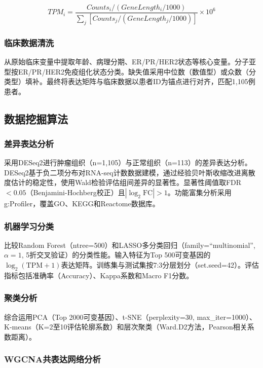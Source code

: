 \documentclass[12pt,a4paper]{article}
\begin{document}
\begin{equation}
TPM_i = \frac{Counts_i / (GeneLength_i / 1000)}{\sum_j [Counts_j / (GeneLength_j / 1000)]} \times 10^6
\end{equation}

\subsubsection{临床数据清洗}

从原始临床变量中提取年龄、病理分期、ER/PR/HER2状态等核心变量。分子亚型按ER/PR/HER2免疫组化状态分类。缺失值采用中位数（数值型）或众数（分类型）填补。最终将表达矩阵与临床数据以患者ID为锚点进行对齐，匹配1,105例患者。

\subsection{数据挖掘算法}

\subsubsection{差异表达分析}

采用DESeq2\cite{love2014}进行肿瘤组织（n=1,105）与正常组织（n=113）的差异表达分析。DESeq2基于负二项分布对RNA-seq计数数据建模，通过经验贝叶斯收缩改进离散度估计的稳定性，使用Wald检验评估组间差异的显著性。显著性阈值取FDR$<0.05$（Benjamini-Hochberg校正）且$|\log_2\text{FC}|>1$。功能富集分析采用g:Profiler\cite{kolberg2023}，覆盖GO、KEGG和Reactome数据库。

\subsubsection{机器学习分类}

比较Random Forest（ntree=500）\cite{breiman2001}和LASSO多分类回归（family=``multinomial'', $\alpha=1$, 5折交叉验证）\cite{friedman2010}的分类性能。输入特征为Top 500可变基因的$\log_2(\text{TPM}+1)$表达矩阵。训练集与测试集按7:3分层划分（set.seed=42）。评估指标包括准确率（Accuracy）、Kappa系数和Macro F1分数。

\subsubsection{聚类分析}

综合运用PCA（Top 2000可变基因）、t-SNE（perplexity=30, max\_iter=1000）、K-means（K=2至10评估轮廓系数）和层次聚类（Ward.D2方法，Pearson相关系数距离）。

\subsubsection{WGCNA共表达网络分析}
\end{document}
